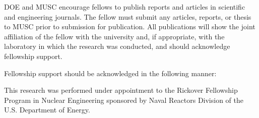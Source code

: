 DOE and MUSC encourage fellows to publish reports and articles in scientific and engineering 
journals.  The fellow must submit any articles, reports, or thesis to MUSC prior to submission for 
publication.  All publications will show the joint affiliation of the fellow with the university and, if 
appropriate, with the laboratory in which the research was conducted, and should acknowledge 
fellowship support. 
 
Fellowship support should be acknowledged in the following manner: 
 
This research was performed under appointment to the Rickover Fellowship 
Program in Nuclear Engineering sponsored by Naval Reactors Division of the 
U.S. Department of Energy. 